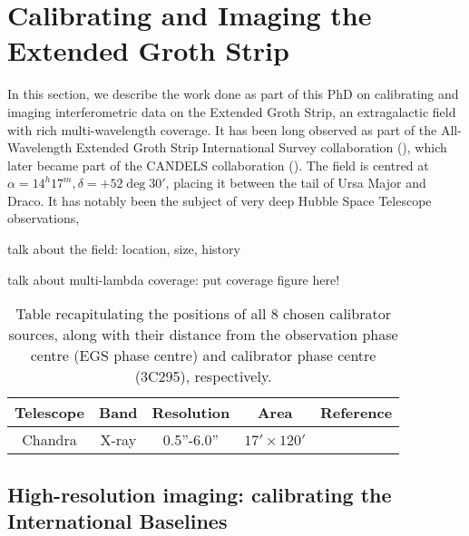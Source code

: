 
\section{Calibrating and Imaging the Extended Groth Strip}\label{section.calibration}
\pg
In this section, we describe the work done as part of this PhD on calibrating and imaging interferometric data on the Extended Groth Strip, an extragalactic field with rich multi-wavelength coverage. It has been long observed as part of the All-Wavelength Extended Groth Strip International Survey collaboration (), which later became part of the CANDELS collaboration (). The field is centred at $\alpha=14^h17^m,\delta=+52\deg 30'$, placing it between the tail of Ursa Major and Draco. It has notably been the subject of very deep Hubble Space Telescope observations, 



talk about the field: location, size, history

talk about multi-lambda coverage: put coverage figure here!

\begin{table}[h!]
\begin{tabular}{ccccc}
Telescope    & Band   & Resolution  & Area & Reference \\\hline
Chandra      & X-ray  & 0.5''-6.0'' & $17'\times 120'$ & \\
\end{tabular}
\caption{\label{table.LOBOS.sources}Table recapitulating the positions of all 8 chosen calibrator sources, along with their distance from the observation phase centre (EGS phase centre) and calibrator phase centre (3C295), respectively.}
\end{table}


\subsection{High-resolution imaging: calibrating the International Baselines}